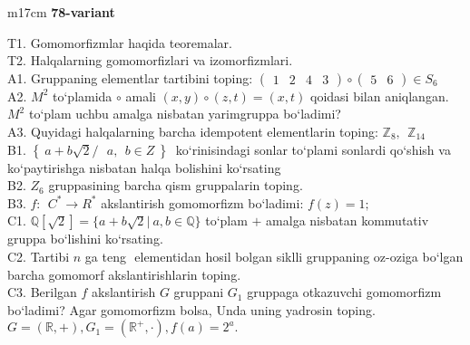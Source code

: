 \documentclass{article}
\begin{document}
\begin{tabular}{m{17cm}}
\textbf{78-variant}
\newline

T1. Gomomorfizmlar haqida teoremalar. \\
T2. Halqalarning gomomorfizlari va izomorfizmlari. \\
A1. Gruppaning elementlar tartibini toping: \(\begin{pmatrix}
1 & 2 & 4 & 3
\end{pmatrix} \circ \begin{pmatrix}
5 & 6
\end{pmatrix} \in S_{6}\) \\
A2. \(M^{2}\) to`plamida \(\circ\) amali \((x,y) \circ (z,t) = (x,t)\) qoidasi bilan aniqlangan. \(M^{2}\) to`plam uchbu amalga nisbatan yarimgruppa bo`ladimi? \\
A3. Quyidagi halqalarning barcha idempotent elementlarin toping: \(\mathbb{Z}_{8},\ \ \mathbb{Z}_{14}\) \\
B1. \(\left\{ \left. \ a + b\sqrt{2}/\ \ \ a,\ \ b \in Z\  \right\} \right.\ \) ko`rinisindagi sonlar to`plami sonlardi qo`shish va ko`paytirishga nisbatan halqa bolishini ko`rsating \\
B2. \(Z_{6}\) gruppasining barcha qism gruppalarin toping. \\
B3. \(f:\ \ C^{*} \rightarrow R^{*}\) akslantirish gomomorfizm bo`ladimi: \(f(z) = 1;\) \\
C1. \(\mathbb{Q}\left\lbrack \sqrt{2} \right\rbrack = \{ a + b\sqrt{2}|\ a,b\mathbb{\in Q}\}\) to`plam \(+\) amalga nisbatan kommutativ gruppa bo`lishini ko`rsating. \\
C2. Tartibi \(n\) ga teng \(< a >\) elementidan hosil bo\textquotesingle lgan siklli gruppaning o\textquotesingle z-o\textquotesingle ziga bo`lgan barcha gomomorf akslantirishlarin toping. \\
C3. Berilgan \(f\) akslantirish \(G\) gruppani \(G_{1}\) gruppaga o\textquotesingle tkazuvchi gomomorfizm bo`ladimi? Agar gomomorfizm bolsa, Unda uning yadrosin toping.\(G = (\mathbb{R}, + ),G_{1} = \left( \mathbb{R}^{+}, \cdot \right),f(a) = 2^{a}.\) \\

\end{tabular}
\vspace{1cm}
\end{document}
